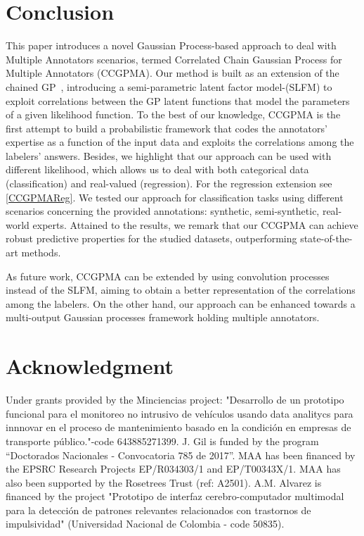 \documentclass[journal]{IEEEtran}
\begin{document}



\section{Conclusion}
This paper introduces a novel Gaussian Process-based approach to deal with Multiple Annotators scenarios, termed Correlated Chain Gaussian Process for Multiple Annotators (CCGPMA). Our method is built as an extension of the chained GP~\cite{saul2016chained}, introducing a semi-parametric latent factor model-(SLFM) to exploit correlations between the GP latent functions that model the parameters of a given likelihood function. To the best of our knowledge, CCGPMA is the first attempt to build a probabilistic framework that codes the annotators' expertise as a function of the input data and exploits the correlations among the labelers' answers. Besides, we highlight that our approach can be used with different likelihood, which allows us to deal with both categorical data (classification) and real-valued (regression). For the regression extension see \cref{CCGPMAReg}. We tested our approach for classification tasks using different scenarios concerning the provided annotations: synthetic, semi-synthetic, real-world experts. Attained to the results, we remark that our CCGPMA can achieve robust predictive properties for the studied datasets, outperforming state-of-the-art methods.

As future work, CCGPMA can be extended by using convolution processes~\cite{alvarez2011computationally} instead of the SLFM, aiming to obtain a better representation of the correlations among the labelers. On the other hand, our approach can be enhanced towards a multi-output Gaussian processes framework holding multiple annotators.

\section*{Acknowledgment}
Under grants provided by the Minciencias project: "Desarrollo de un prototipo funcional para el monitoreo no intrusivo de veh\'iculos
usando data analitycs para innnovar en el proceso de mantenimiento basado en la condici\'on en empresas de transporte p\'ublico."-code 643885271399. J. Gil is funded by the program ``Doctorados Nacionales - Convocatoria 785 de 2017''. MAA has been financed by the EPSRC Research Projects EP/R034303/1 and EP/T00343X/1. MAA has also been supported by the Rosetrees Trust (ref: A2501). A.M. Alvarez is financed by the project "Prototipo de interfaz cerebro-computador multimodal para la detección de patrones
relevantes relacionados con trastornos de impulsividad" (Universidad Nacional de Colombia - code 50835).
\end{document}
